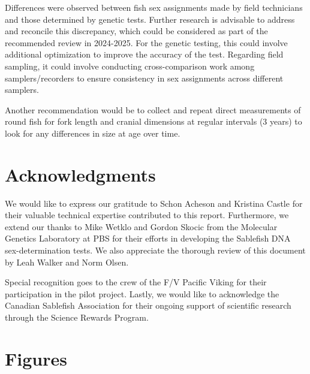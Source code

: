 \documentclass[12pt]{article}\usepackage[]{graphicx}\usepackage[]{color}
\begin{document}
Differences were observed between fish sex assignments made by field technicians and those determined by genetic tests. Further research is advisable to address and reconcile this discrepancy, which could be considered as part of the recommended review in 2024-2025. For the genetic testing, this could involve additional optimization to improve the accuracy of the test. Regarding field sampling, it could involve conducting cross-comparison work among samplers/recorders to ensure consistency in sex assignments across different samplers.

Another recommendation would be to collect and repeat direct measurements of round fish for fork length and cranial dimensions at regular intervals (3 years) to look for any differences in size at age over time.

\hypertarget{acknowledgments}{%
\section{Acknowledgments}\label{acknowledgments}}

We would like to express our gratitude to Schon Acheson and Kristina Castle for their valuable technical expertise contributed to this report. Furthermore, we extend our thanks to Mike Wetklo and Gordon Skocic from the Molecular Genetics Laboratory at PBS for their efforts in developing the Sablefish DNA sex-determination tests. We also appreciate the thorough review of this document by Leah Walker and Norm Olsen.

Special recognition goes to the crew of the F/V Pacific Viking for their participation in the pilot project. Lastly, we would like to acknowledge the Canadian Sablefish Association for their ongoing support of scientific research through the Science Rewards Program.

\clearpage

\hypertarget{figures}{%
\section{Figures}\label{figures}}
\end{document}
